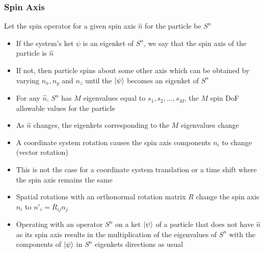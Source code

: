 \documentclass[8pt,t,mathserif,aspectratio=169]{beamer}
\begin{document}
\begin{frame}
  \frametitle{Spin Axis}
  \vspace{1mm}
  Let the spin operator for a given spin axis $\hat{n}$ for the particle be $S^n$
  \begin{itemize}
    \item If the system's ket $\psi$ is an eigenket of $S^n$, we say that the spin axis of the particle is $\hat{n}$
    \item If not, then particle spins about some other axis which can be obtained by varying $n_x,n_y$ and $n_z$ until the $\ket{\psi}$ becomes an eigenket of $S^n$ 
    \item For any $\hat{n}$, $S^n$ has $M$ eigenvalues equal to $s_1,s_2,...,s_M$, the $M$ spin DoF allowable values for the particle
    \item As $\hat{n}$ changes, the eigenkets corresponding to the $M$ eigenvalues change 
    \item A coordinate system rotation causes the spin axis components $n_i$ to change (vector rotation)
    \item This is not the case for a coordinate system translation or a time shift where the spin axis remains the same
    \item Spatial rotations with an orthonormal rotation matrix $R$ change the spin axis $n_i$ to $n'_i = R_{ij} n_j$
    \item Operating with an operator $S^n$ on a ket $\ket{\psi}$ of a particle that does not have $\hat{n}$ as its spin axis results in the multiplication of the eigenvalues of $S^n$ with the components of $\ket{\psi}$ in $S^n$ eigenkets directions as usual
  \end{itemize}
\end{frame}
\end{document}
